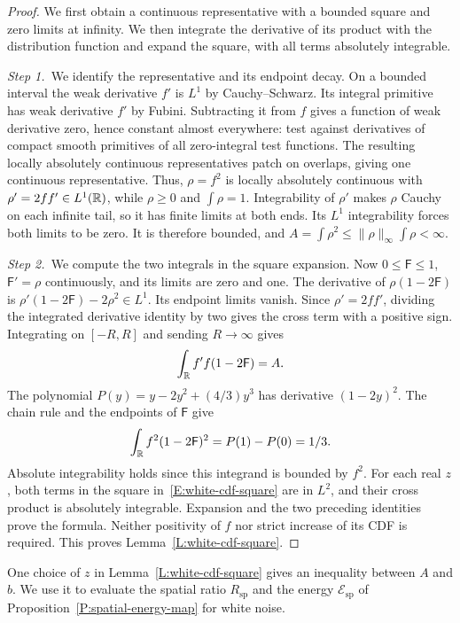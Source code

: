 \begin{proof}
  We first obtain a continuous representative with a bounded square and zero
  limits at infinity. We then integrate the derivative of its product with the
  distribution function and expand the square, with all terms absolutely
  integrable.


  \medskip
  \noindent\textit{Step 1.~}We identify the representative and its endpoint
  decay.
  On a bounded interval the weak derivative $f'$ is $L^1$ by Cauchy--Schwarz.
  Its integral primitive has weak derivative $f'$ by Fubini. Subtracting it from
  $f$ gives a function of weak derivative zero, hence constant almost
  everywhere: test against derivatives of compact smooth primitives of all
  zero-integral test functions. The resulting locally absolutely continuous
  representatives patch on overlaps, giving one continuous representative. Thus,
  $\rho = f^2$ is locally absolutely continuous with $\rho' = 2ff' \in L^1(\mathbb{R})$,
  while $\rho \ge 0$ and $\int\rho = 1$. Integrability of $\rho'$ makes $\rho$
  Cauchy on each infinite tail, so it has finite limits at both ends. Its $L^1$
  integrability forces both limits to be zero. It is therefore bounded, and $A =
  \int\rho^2 \le \|\rho\|_\infty\int\rho < \infty$.


  \medskip
  \noindent\textit{Step 2.~}We compute the two integrals in the square
  expansion.
  Now $0 \le \mathsf{F} \le 1$, $\mathsf{F}' = \rho$ continuously, and its
  limits are zero and one. The derivative of $\rho(1-2\mathsf{F})$ is
  $\rho'(1-2\mathsf{F})-2\rho^2 \in L^1$. Its endpoint limits vanish.
  Since $\rho'=2ff'$, dividing the integrated derivative identity by two gives
  the cross term with a positive sign.
  Integrating on $[-R,R]$ and sending $R \to \infty$ gives
  \[
    \int_{\mathbb{R}} f'f(1-2\mathsf{F})=A .
  \]
  The polynomial $P(y) = y-2y^2+(4/3)y^3$ has derivative $(1-2y)^2$. The chain
  rule and the endpoints of $\mathsf{F}$ give
  \[
    \int_{\mathbb{R}} f^2(1-2\mathsf{F})^2=P(1)-P(0)=1/3 .
  \]
  Absolute integrability holds since this integrand is bounded by $f^2$. For
  each real $z$, both terms in the square in~\eqref{E:white-cdf-square} are in
  $L^2$, and their cross product is absolutely integrable. Expansion and the two
  preceding identities prove the formula. Neither positivity of $f$ nor strict
  increase of its CDF is required. This proves Lemma~\ref{L:white-cdf-square}.
\end{proof}

One choice of $z$ in Lemma~\ref{L:white-cdf-square} gives an inequality
between $A$ and $b$. We use it to evaluate the spatial ratio $R_{\mathrm{sp}}$
and the energy $\mathcal{E}_{\mathrm{sp}}$ of
Proposition~\ref{P:spatial-energy-map} for white noise.

